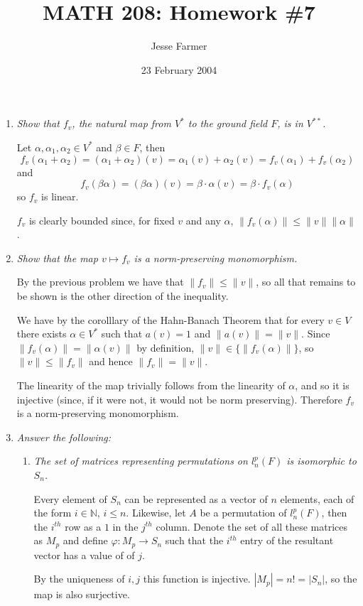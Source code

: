 \documentclass[11pt]{article}
\title{MATH 208: Homework \#7}
\author{Jesse Farmer}
\date{23 February 2004}
\begin{document}
\maketitle
\begin{enumerate}
\item \emph{Show that $f_v$, the natural map from $V^{\ast}$ to the ground field $F$, is in $V^{\ast\ast}$.}

Let $\alpha, \alpha_1, \alpha_2 \in V^{\ast}$ and $\beta \in F$, then
\[f_v(\alpha_1+\alpha_2) = (\alpha_1 + \alpha_2)(v) = \alpha_1(v) + \alpha_2(v) = f_v(\alpha_1) + f_v(\alpha_2)\]
and
\[f_v(\beta\alpha) = (\beta\alpha)(v) = \beta \cdot \alpha(v) = \beta \cdot f_v(\alpha)\]
so $f_v$ is linear.

$f_v$ is clearly bounded since, for fixed $v$ and any $\alpha$, $\|f_v(\alpha)\| \leq \|v\|\|\alpha\|$.
\item \emph{Show that the map $v \mapsto f_v$ is a norm-preserving monomorphism.}

By the previous problem we have that $\|f_v\| \leq \|v\|$, so all that remains to be shown is the other direction of the inequality.

We have by the corolllary of the Hahn-Banach Theorem that for every $v \in V$ there exists $\alpha \in V^{\ast}$ such that $a(v) = 1$ and $\|a(v)\| = \|v\|$.  Since $\|f_v(\alpha)\| = \|\alpha(v)\|$ by definition, $\|v\| \in \{\|f_v(\alpha)\|\}$, so $\|v\| \leq \|f_v\|$ and hence $\|f_v\| = \|v\|$.

The linearity of the map trivially follows from the linearity of $\alpha$, and so it is injective (since, if it were not, it would not be norm preserving).  Therefore $f_v$ is a norm-preserving monomorphism.
 
\item \emph{Answer the following:}

\begin{enumerate}
\item \emph{The set of matrices representing permutations on $l^p_n(F)$ is isomorphic to $S_n$.}

Every element of $S_n$ can be represented as a vector of $n$ elements, each of the form $i \in \mathbb{N},\,i \leq n$.  Likewise, let $A$ be a permutation of $l^p_n(F)$, then the $i^{th}$ row as a $1$ in the $j^{th}$ column.  Denote the set of all these matrices as $M_p$ and define $\varphi: M_p \rightarrow S_n$ such that the $i^{th}$ entry of the resultant vector has a value of of $j$.

By the uniqueness of $i,j$ this function is injective.  $|M_p| = n! = |S_n|$, so the map is also surjective.


\end{enumerate}
\end{enumerate}
\end{document}
